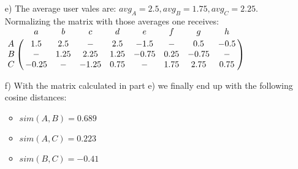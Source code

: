\documentclass[11pt,a4paper]{scrartcl}
\begin{document}
\begin{itemize}
	\item[e)] The average user vales are: $avg_A = 2.5, avg_B = 1.75, avg_C = 2.25$. Normalizing the matrix with those averages one receives: \\
$\bordermatrix{
  & a	& b   & c & d & e & f & g & h  \cr
A & 1.5 & 2.5 & - & 2.5 & -1.5 & - & 0.5 & -0.5 \cr
B & - & 1.25 & 2.25 & 1.25 & -0.75 & 0.25 & -0.75 & - \cr
C & -0.25 & - & -1.25 & 0.75 & - & 1.75 & 2.75 & 0.75 \cr
}
$ 
	\item[f)] With the matrix calculated in part e) we finally end up with the following cosine distances:
	\begin{itemize}
		\item $sim(A,B) = 0.689 $
		\item $sim(A,C) = 0.223$
		\item $sim(B,C) = -0.41 $
	\end{itemize}
	\end{itemize}
\end{document}
